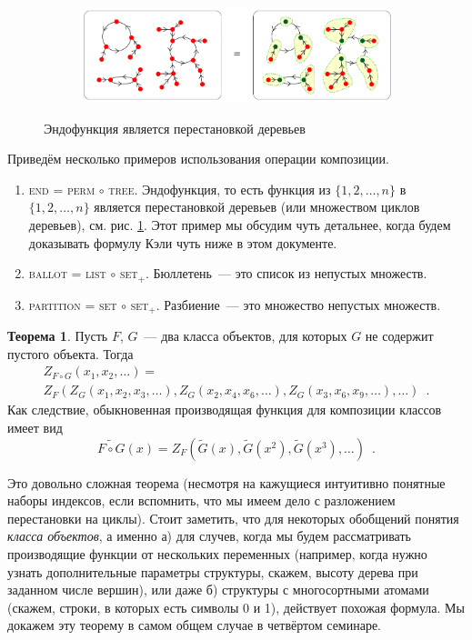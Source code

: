 \documentclass[a5paper]{article}
\theoremstyle{definition}
\newtheorem*{theorem}{Теорема}
\begin{document}
\begin{figure}[h]
\centering
\begin{subfigure}{.8\textwidth}
    \centering
    \includegraphics[width=\textwidth]{par_composition.png}
\end{subfigure}%
\caption{Эндофункция является перестановкой деревьев}
\label{fig:composition}	
\end{figure}

Приведём несколько примеров использования операции композиции.
\begin{enumerate}
    \item \textsc{end} = \textsc{perm} \( \circ \) \textsc{tree}. Эндофункция,
то есть функция из \(
 \{1,2,\ldots, n\}\) в \( \{1,2,\ldots, n\} \) является перестановкой деревьев (или множеством циклов
деревьев), см. рис. \ref{fig:composition}. Этот пример мы обсудим чуть
детальнее, когда будем доказывать формулу Кэли чуть ниже в этом документе.
    \item \textsc{ballot} = \textsc{list} \( \circ \) \textsc{set}$_+$.
Бюллетень~--- это список из непустых множеств.
    \item \textsc{partition} = \textsc{set} \( \circ \) \textsc{set}$_+$.
Разбиение~--- это множество непустых множеств.
\end{enumerate}

\begin{theorem}
	Пусть \( F \), \( G \)~--- два класса объектов, для 
	которых \( G \) не содержит пустого объекта. Тогда
	\begin{multline*}
		Z_{F \circ G}(x_1, x_2, \ldots) =\\ Z_F(
			Z_G(x_1, x_2, x_3, \ldots),
			Z_G(x_2, x_4, x_6, \ldots),
            Z_G(x_3, x_6, x_9, \ldots),
			\ldots
		) \enspace .
	\end{multline*}
	Как следствие, обыкновенная производящая функция для композиции классов имеет вид
	\[
		\widetilde{F \circ G}(x) = Z_F(\widetilde G(x), \widetilde G(x^2), 
		\widetilde G(x^3), \ldots)
		\enspace .
	\]
\end{theorem}
Это довольно сложная теорема (несмотря на кажущиеся интуитивно понятные наборы
индексов, если вспомнить, что мы имеем дело с разложением перестановки на циклы).
Стоит заметить, что для некоторых обобщений понятия \textit{класса объектов}, а именно
а) для случев, когда мы будем рассматривать производящие функции от нескольких
переменных (например, когда нужно узнать дополнительные параметры структуры,
скажем, высоту дерева при заданном числе вершин), или даже б) структуры с
многосортными атомами
(скажем, строки, в которых есть символы 0 и 1), действует похожая формула.
Мы докажем эту теорему в самом общем случае в четвёртом семинаре.
\end{document}
